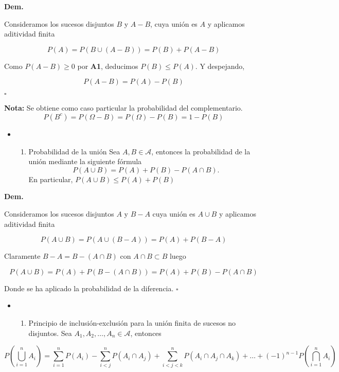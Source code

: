 \textbf{Dem.}

Consideramos los sucesos disjuntos \(B\) y \(A-B\), cuya unión es \(A\)
y aplicamos aditividad finita

\[
P(A) = P(B \cup (A-B)) = P(B) + P(A-B)
\]

Como \(P(A-B) \geq 0\) por \textbf{A1}, deducimos \(P(B) \leq P(A)\). Y
despejando,

\[
P(A-B) = P(A) - P(B)
\]

\(\square\)

\textbf{Nota:} Se obtiene como caso particular la probabilidad del
complementario. \[
P(B^c) = P(\Omega - B) = P(\Omega) - P(B) = 1 - P(B)
\]

\begin{itemize}
\item
  \begin{enumerate}
  \def\labelenumi{\alph{enumi})}
  \setcounter{enumi}{4}
  \tightlist
  \item
    Probabilidad de la unión Sea \(A, B \in \mathcal{A}\), entonces la
    probabilidad de la unión mediante la siguiente fórmula \[
    P(A \cup B) = P(A)+P(B)−P(A \cap B).
    \] En particular, \(P(A\cup B) \leq P(A) + P(B)\)
  \end{enumerate}
\end{itemize}

\textbf{Dem.}

Consideramos los sucesos disjuntos \(A\) y \(B-A\) cuya unión es
\(A \cup B\) y aplicamos aditividad finita

\[
P(A \cup B) = P(A \cup (B-A)) = P(A) + P(B-A)
\]

Claramente \(B-A = B - (A \cap B)\) con \(A \cap B \subset B\) luego

\[
P(A \cup B) = P(A)  + P(B - (A \cap B)) = P(A) + P(B) - P(A \cap B)
\]

Donde se ha aplicado la probabilidad de la diferencia. \(\square\)

\begin{itemize}
\item
  \begin{enumerate}
  \def\labelenumi{\alph{enumi})}
  \setcounter{enumi}{5}
  \tightlist
  \item
    Principio de inclusión-exclusión para la unión finita de sucesos no
    disjuntos. Sea \(A_1, A_2, \dots, A_n \in \mathcal{A}\), entonces
  \end{enumerate}
\end{itemize}

\[
P\left(\bigcup_{i=1}^n A_i \right) = \sum_{i=1}^n P(A_i) - \sum_{i < j}^n P(A_i \cap A_j) + \sum_{i < j < k}^n P(A_i \cap A_j \cap A_k) + \dots  + (-1)^{n-1} P\left(\bigcap_{i=1}^n A_i \right)
\]

